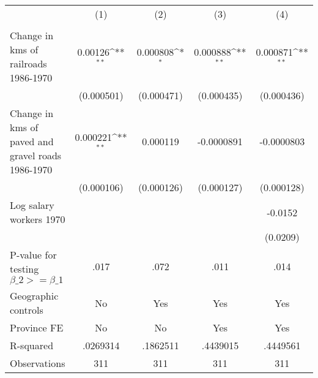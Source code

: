 {
\def\sym#1{\ifmmode^{#1}\else\(^{#1}\)\fi}
\begin{tabular}{l*{4}{c}}
\hline\hline
                &\multicolumn{1}{c}{(1)}&\multicolumn{1}{c}{(2)}&\multicolumn{1}{c}{(3)}&\multicolumn{1}{c}{(4)}\\
                &\multicolumn{1}{c}{}&\multicolumn{1}{c}{}&\multicolumn{1}{c}{}&\multicolumn{1}{c}{}\\
\hline
Change in kms of railroads 1986-1970&  0.00126\sym{**} & 0.000808\sym{*}  & 0.000888\sym{**} & 0.000871\sym{**} \\
                &(0.000501)         &(0.000471)         &(0.000435)         &(0.000436)         \\
[1em]
Change in kms of paved and gravel roads 1986-1970& 0.000221\sym{**} & 0.000119         &-0.0000891         &-0.0000803         \\
                &(0.000106)         &(0.000126)         &(0.000127)         &(0.000128)         \\
[1em]
Log salary workers 1970&                  &                  &                  &  -0.0152         \\
                &                  &                  &                  & (0.0209)         \\
\hline
P-value for testing $\beta\_{2} >= \beta\_{1}$&     .017         &     .072         &     .011         &     .014         \\
Geographic controls&       No         &      Yes         &      Yes         &      Yes         \\
Province FE     &       No         &       No         &      Yes         &      Yes         \\
R-squared       & .0269314         & .1862511         & .4439015         & .4449561         \\
Observations    &      311         &      311         &      311         &      311         \\
\hline\hline
\end{tabular}
}
